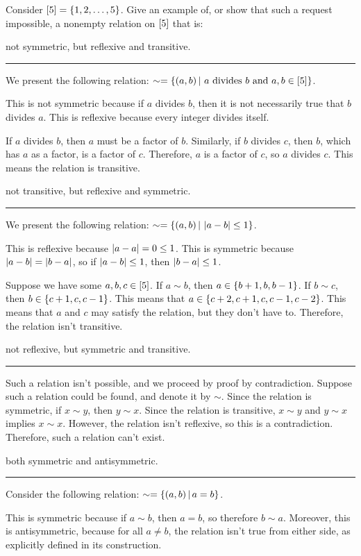 \documentclass{article}
\begin{document}
\problem{}

Consider $\left [ 5 \right]=\left \{ 1,2,\dots,5 \right \}$.
Give an example of, or show that such a request impossible, a nonempty relation on $\left [ 5 \right]$ that is:



\subproblema{}
not symmetric, but reflexive and transitive.
\hrule

We present the following relation:
$\sim = \left \{ \left (a, b \right) |\ a \text{ divides } b \text{ and } a, b \in \left [ 5 \right] \right \}$.

This is not symmetric because if $a$ divides $b$, then it is not necessarily true that $b$ divides $a$.
This is reflexive because every integer divides itself.

If $a$ divides $b$, then $a$ must be a factor of $b$.
Similarly, if $b$ divides $c$, then $b$, which has $a$ as a factor, is a factor of $c$.
Therefore, $a$ is a factor of $c$, so $a$ divides $c$.
This means the relation is transitive.

\subproblema{}
not transitive, but reflexive and symmetric.
\hrule

We present the following relation:
$\sim = \left \{ \left (a, b \right) |\, \left\lvert a-b \right\rvert \leq 1 \right \}$.

This is reflexive because $ \left\lvert a-a \right\rvert = 0 \leq 1$.
This is symmetric because $ \left\lvert a-b \right\rvert = \left\lvert b-a \right\rvert$, so if $\left\lvert a-b \right\rvert \leq 1$, then $\left\lvert b-a \right\rvert \leq 1$.

Suppose we have some $a, b, c \in \left [ 5 \right]$.
If $a \sim b$, then $a \in \left \{ b + 1, b, b - 1 \right \}$.
If $b \sim c$, then $b \in \left \{ c + 1, c, c - 1 \right \}$.
This means that $a \in \left \{ c+2, c+1, c, c-1, c-2 \right \}$.
This means that $a$ and $c$ may satisfy the relation, but they don't have to.
Therefore, the relation isn't transitive.


\subproblema{}
not reflexive, but symmetric and transitive.
\hrule

Such a relation isn't possible, and we proceed by proof by contradiction.
Suppose such a relation could be found, and denote it by $\sim$.
Since the relation is symmetric, if $x \sim y$, then $y \sim x$.
Since the relation is transitive, $x \sim y$ and $y \sim x$ implies $x \sim x$.
However, the relation isn't reflexive, so this is a contradiction.
Therefore, such a relation can't exist.

\subproblema{}
both symmetric and antisymmetric.
\hrule

Consider the following relation: $\sim = \left \{ \left (a, b \right) |\, a = b \right \}$.

This is symmetric because if $a \sim b$, then $a = b$, so therefore $b \sim a$.
Moreover, this is antisymmetric, because for all $a \neq b$, the relation isn't true from either side, as explicitly defined in its construction.
\end{document}
